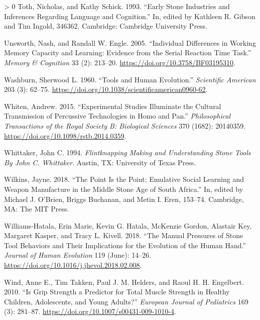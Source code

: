 \documentclass[smallextended]{svjour3}       %
\newlength{\cslhangindent}
\newenvironment{CSLReferences}[3] %
 {%
  \setlength{\parindent}{0pt}
  \ifodd #1 \everypar{\setlength{\hangindent}{\cslhangindent}}\ignorespaces\fi
  \ifnum #2 > 0
  \setlength{\parskip}{#3\baselineskip}
  \fi
 }%
 {}
\begin{document}
\begin{CSLReferences}{1}{0}
\leavevmode\hypertarget{ref-toth1993}{}%
Toth, Nicholas, and Kathy Schick. 1993. {``Early Stone Industries and
Inferences Regarding Language and Cognition.''} In, edited by Kathleen
R. Gibson and Tim Ingold, 346362. Cambridge: Cambridge University Press.

\leavevmode\hypertarget{ref-unsworth2005}{}%
Unsworth, Nash, and Randall W. Engle. 2005. {``Individual Differences in
Working Memory Capacity and Learning: Evidence from the Serial Reaction
Time Task.''} \emph{Memory \& Cognition} 33 (2): 213--20.
\url{https://doi.org/10.3758/BF03195310}.

\leavevmode\hypertarget{ref-washburn1960}{}%
Washburn, Sherwood L. 1960. {``Tools and Human Evolution.''}
\emph{Scientific American} 203 (3): 62--75.
\url{https://doi.org/10.1038/scientificamerican0960-62}.

\leavevmode\hypertarget{ref-whiten2015}{}%
Whiten, Andrew. 2015. {``Experimental Studies Illuminate the Cultural
Transmission of Percussive Technologies in Homo and Pan.''}
\emph{Philosophical Transactions of the Royal Society B: Biological
Sciences} 370 (1682): 20140359.
\url{https://doi.org/10.1098/rstb.2014.0359}.

\leavevmode\hypertarget{ref-whittaker1994}{}%
Whittaker, John C. 1994. \emph{Flintknapping Making and Understanding
Stone Tools By John C. Whittaker}. Austin, TX: University of Texas
Press.

\leavevmode\hypertarget{ref-wilkins2018}{}%
Wilkins, Jayne. 2018. {``The Point Is the Point: Emulative Social
Learning and Weapon Manufacture in the Middle Stone Age of South
Africa.''} In, edited by Michael J. O'Brien, Briggs Buchanan, and Metin
I. Eren, 153--74. Cambridge, MA: The MIT Press.

\leavevmode\hypertarget{ref-williams-hatala2018}{}%
Williams-Hatala, Erin Marie, Kevin G. Hatala, McKenzie Gordon, Alastair
Key, Margaret Kasper, and Tracy L. Kivell. 2018. {``The Manual Pressures
of Stone Tool Behaviors and Their Implications for the Evolution of the
Human Hand.''} \emph{Journal of Human Evolution} 119 (June): 14--26.
\url{https://doi.org/10.1016/j.jhevol.2018.02.008}.

\leavevmode\hypertarget{ref-wind2010}{}%
Wind, Anne E., Tim Takken, Paul J. M. Helders, and Raoul H. H.
Engelbert. 2010. {``Is Grip Strength a Predictor for Total Muscle
Strength in Healthy Children, Adolescents, and Young Adults?''}
\emph{European Journal of Pediatrics} 169 (3): 281--87.
\url{https://doi.org/10.1007/s00431-009-1010-4}.


\end{CSLReferences}
\end{document}
